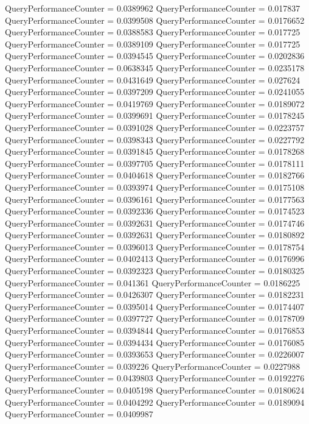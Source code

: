 \documentclass[9pt]{article}
\theoremstyle{plain}
\theoremstyle{definition}
\theoremstyle{remark}
\numberwithin{equation}{section}
\begin{document}
QueryPerformanceCounter  =  0.0389962
QueryPerformanceCounter  =  0.017837
QueryPerformanceCounter  =  0.0399508
QueryPerformanceCounter  =  0.0176652
QueryPerformanceCounter  =  0.0388583
QueryPerformanceCounter  =  0.017725
QueryPerformanceCounter  =  0.0389109
QueryPerformanceCounter  =  0.017725
QueryPerformanceCounter  =  0.0394545
QueryPerformanceCounter  =  0.0202836
QueryPerformanceCounter  =  0.0638345
QueryPerformanceCounter  =  0.0235178
QueryPerformanceCounter  =  0.0431649
QueryPerformanceCounter  =  0.027624
QueryPerformanceCounter  =  0.0397209
QueryPerformanceCounter  =  0.0241055
QueryPerformanceCounter  =  0.0419769
QueryPerformanceCounter  =  0.0189072
QueryPerformanceCounter  =  0.0399691
QueryPerformanceCounter  =  0.0178245
QueryPerformanceCounter  =  0.0391028
QueryPerformanceCounter  =  0.0223757
QueryPerformanceCounter  =  0.0398343
QueryPerformanceCounter  =  0.0227792
QueryPerformanceCounter  =  0.0391845
QueryPerformanceCounter  =  0.0178268
QueryPerformanceCounter  =  0.0397705
QueryPerformanceCounter  =  0.0178111
QueryPerformanceCounter  =  0.0404618
QueryPerformanceCounter  =  0.0182766
QueryPerformanceCounter  =  0.0393974
QueryPerformanceCounter  =  0.0175108
QueryPerformanceCounter  =  0.0396161
QueryPerformanceCounter  =  0.0177563
QueryPerformanceCounter  =  0.0392336
QueryPerformanceCounter  =  0.0174523
QueryPerformanceCounter  =  0.0392631
QueryPerformanceCounter  =  0.0174746
QueryPerformanceCounter  =  0.0392631
QueryPerformanceCounter  =  0.0180892
QueryPerformanceCounter  =  0.0396013
QueryPerformanceCounter  =  0.0178754
QueryPerformanceCounter  =  0.0402413
QueryPerformanceCounter  =  0.0176996
QueryPerformanceCounter  =  0.0392323
QueryPerformanceCounter  =  0.0180325
QueryPerformanceCounter  =  0.041361
QueryPerformanceCounter  =  0.0186225
QueryPerformanceCounter  =  0.0426307
QueryPerformanceCounter  =  0.0182231
QueryPerformanceCounter  =  0.0395014
QueryPerformanceCounter  =  0.0174407
QueryPerformanceCounter  =  0.0397727
QueryPerformanceCounter  =  0.0178709
QueryPerformanceCounter  =  0.0394844
QueryPerformanceCounter  =  0.0176853
QueryPerformanceCounter  =  0.0394434
QueryPerformanceCounter  =  0.0176085
QueryPerformanceCounter  =  0.0393653
QueryPerformanceCounter  =  0.0226007
QueryPerformanceCounter  =  0.039226
QueryPerformanceCounter  =  0.0227988
QueryPerformanceCounter  =  0.0439803
QueryPerformanceCounter  =  0.0192276
QueryPerformanceCounter  =  0.0405198
QueryPerformanceCounter  =  0.0180624
QueryPerformanceCounter  =  0.0404292
QueryPerformanceCounter  =  0.0189094
QueryPerformanceCounter  =  0.0409987
\end{document}
